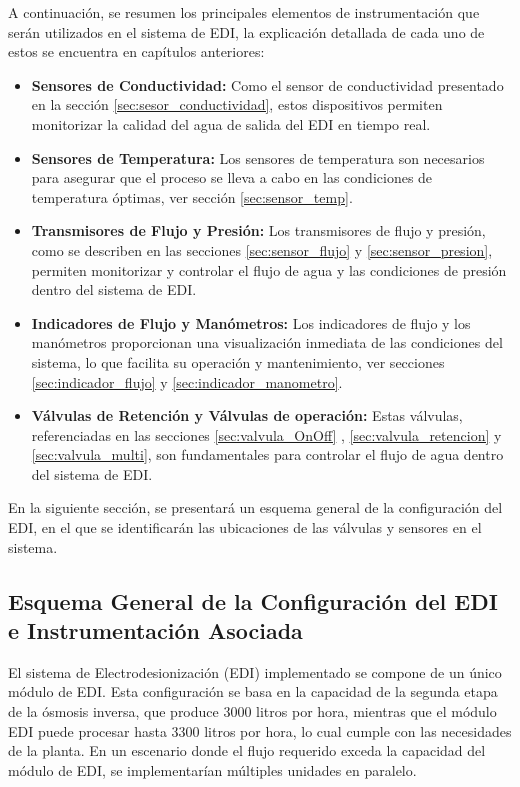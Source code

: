 A continuación, se resumen los principales elementos de instrumentación que serán utilizados en el sistema de EDI, la explicación detallada de cada uno de estos se encuentra en capítulos anteriores:
\begin{itemize}
    \item \textbf{Sensores de Conductividad:} Como el sensor de conductividad presentado en la sección \ref{sec:sesor_conductividad}, estos dispositivos permiten monitorizar la calidad del agua de salida del EDI en tiempo real.

    \item \textbf{Sensores de Temperatura:} Los sensores de temperatura son necesarios para asegurar que el proceso se lleva a cabo en las condiciones de temperatura óptimas, ver sección \ref{sec:sensor_temp}.

    \item \textbf{Transmisores de Flujo y Presión:} Los transmisores de flujo y presión, como se describen en las secciones \ref{sec:sensor_flujo} y \ref{sec:sensor_presion}, permiten monitorizar y controlar el flujo de agua y las condiciones de presión dentro del sistema de EDI.

    \item \textbf{Indicadores de Flujo y Manómetros:} Los indicadores de flujo y los manómetros proporcionan una visualización inmediata de las condiciones del sistema, lo que facilita su operación y mantenimiento, ver secciones \ref{sec:indicador_flujo} y \ref{sec:indicador_manometro}.

    \item \textbf{Válvulas de Retención y Válvulas de operación:} Estas válvulas, referenciadas en las secciones \ref{sec:valvula_OnOff} , \ref{sec:valvula_retencion} y \ref{sec:valvula_multi}, son fundamentales para controlar el flujo de agua dentro del sistema de EDI.
\end{itemize}

En la siguiente sección, se presentará un esquema general de la configuración del EDI, en el que se identificarán las ubicaciones de las válvulas y sensores en el sistema.



\subsection{Esquema General de la Configuración del EDI e Instrumentación Asociada}

El sistema de Electrodesionización (EDI) implementado se compone de un único módulo de EDI.
Esta configuración se basa en la capacidad de la segunda etapa de la ósmosis inversa, que
produce 3000 litros por hora, mientras que el módulo EDI puede procesar hasta 3300 litros por hora,
lo cual cumple con las necesidades de la planta. En un escenario donde el flujo requerido exceda la
capacidad del módulo de EDI, se implementarían múltiples unidades en paralelo.\\

